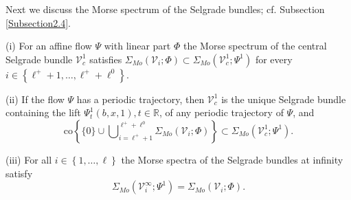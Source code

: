 	Next we discuss the Morse spectrum of the Selgrade bundles; cf. Subsection
	\ref{Subsection2.4}.
	
	\begin{theorem}
		\label{Theorem_spectrum}(i) For an affine flow $\Psi$ with linear part $\Phi$
		the Morse spectrum of the central Selgrade bundle $\mathcal{V}_{c}^{1}$
		satisfies $\Sigma_{Mo}(\mathcal{V}_{i};\Phi)\subset\Sigma_{Mo}(\mathcal{V}
		_{c}^{1};\Psi^{1})$ for every $i\in\left\{  \ell^{+}+1,\ldots,\ell^{+}
		+\ell^{0}\right\}  $.
		
		(ii) If the flow $\Psi$ has a periodic trajectory, then $\mathcal{V}_{c}^{1}$
		is the unique Selgrade bundle containing the lift $\Psi_{t}^{1}(b,x,1),t\in
		\mathbb{R}$, of any periodic trajectory of $\Psi$, and
		\[
		\mathrm{co}\left\{  \{0\}\cup\bigcup\nolimits_{i=\ell^{+}+1}^{\ell^{+}%
			+\ell^{0}}\Sigma_{Mo}(\mathcal{V}_{i};\Phi)\right\}  \subset\Sigma
		_{Mo}(\mathcal{V}_{c}^{1};\Psi^{1}).
		\]
		
		
		(iii) For all $i\in\left\{  1,\ldots,\ell\right\}  $ the Morse spectra of the
		Selgrade bundles at infinity satisfy%
		\[
		\Sigma_{Mo}(\mathcal{V}_{i}^{\infty};\Psi^{1})=\Sigma_{Mo}(\mathcal{V}%
		_{i};\Phi).
		\]
		
	\end{theorem}
	

